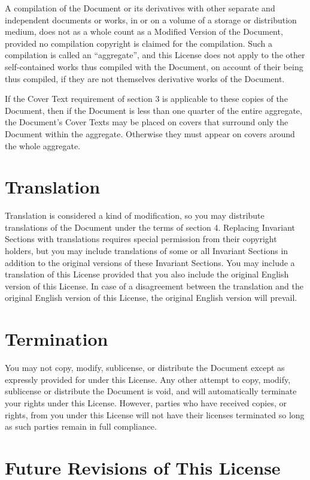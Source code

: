 	A compilation of the Document or its derivatives with other separate
	and independent documents or works, in or on a volume of a storage or
	distribution medium, does not as a whole count as a Modified Version
	of the Document, provided no compilation copyright is claimed for the
	compilation.  Such a compilation is called an ``aggregate'', and this
	License does not apply to the other self-contained works thus compiled
	with the Document, on account of their being thus compiled, if they
	are not themselves derivative works of the Document.

	If the Cover Text requirement of section 3 is applicable to these
	copies of the Document, then if the Document is less than one quarter
	of the entire aggregate, the Document's Cover Texts may be placed on
	covers that surround only the Document within the aggregate.
	Otherwise they must appear on covers around the whole aggregate.


	\section{Translation}

	Translation is considered a kind of modification, so you may
	distribute translations of the Document under the terms of section 4.
	Replacing Invariant Sections with translations requires special
	permission from their copyright holders, but you may include
	translations of some or all Invariant Sections in addition to the
	original versions of these Invariant Sections.  You may include a
	translation of this License provided that you also include the
	original English version of this License.  In case of a disagreement
	between the translation and the original English version of this
	License, the original English version will prevail.


	\section{Termination}

	You may not copy, modify, sublicense, or distribute the Document except
	as expressly provided for under this License.  Any other attempt to
	copy, modify, sublicense or distribute the Document is void, and will
	automatically terminate your rights under this License.  However,
	parties who have received copies, or rights, from you under this
	License will not have their licenses terminated so long as such
	parties remain in full compliance.


	\section{Future Revisions of This License}


